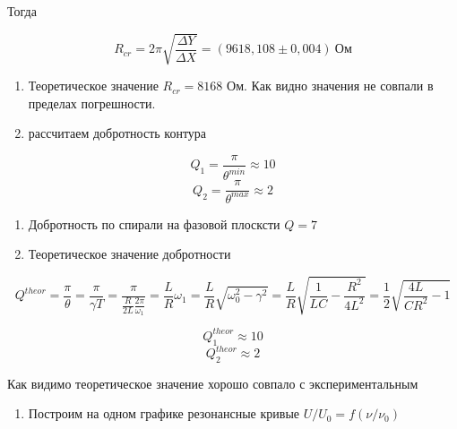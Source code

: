 \documentclass[a4paper,12pt]{article}
\begin{document}
Тогда 

\begin{equation*}
    R_{cr} = 2 \pi \sqrt{\frac{\Delta Y}{\Delta X}} = (9618,108 \pm 0,004) \ \text{Ом}
\end{equation*}

\begin{enumerate}[resume]
    \item Теоретическое значение $R_{cr} = 8168$ Ом. Как видно значения не совпали в пределах погрешности.
    \item рассчитаем добротность контура
\end{enumerate}

\begin{equation*}
    Q_1 = \frac{\pi}{\theta^{min}} \approx 10
\end{equation*}
\begin{equation*}
    Q_2 = \frac{\pi}{\theta^{max}} \approx 2
\end{equation*}

\begin{enumerate}[resume]
    \item Добротность по спирали на фазовой плосксти $Q = 7$
    \item Теоретическое значение добротности
\end{enumerate}

\begin{equation*}
    Q^{theor} = \frac{\pi}{\theta} = \frac{\pi}{\gamma T} = \frac{\pi}{\frac{R}{2L}\frac{2\pi}{\omega_1}} = \frac{L}{R}\omega_1 = \frac{L}{R}\sqrt{\omega_0^2 - \gamma^2} = \frac{L}{R}\sqrt{\frac{1}{LC} - \frac{R^2}{4L^2}} = \frac{1}{2}\sqrt{\frac{4L}{CR^2} - 1}
\end{equation*}

\begin{equation*}
    Q_1^{theor} \approx 10
\end{equation*}
\begin{equation*}
    Q_2^{theor} \approx 2
\end{equation*}

Как видимо теоретическое значение хорошо совпало с экспериментальным

\begin{enumerate}[resume]
    \item Построим на одном графике резонансные кривые $U/U_0 = f(\nu/\nu_0)$
\end{enumerate}
\end{document}
